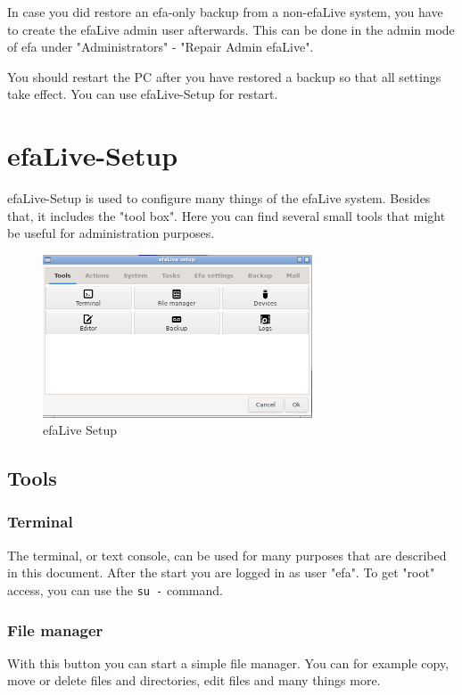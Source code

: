 \documentclass[a4paper,12pt,twoside]{article}
\begin{document}
In case you did restore an efa-only backup from a non-efaLive system, you have
to create the efaLive admin user afterwards. This can be done in the admin mode
of efa under "Administrators" - "Repair Admin efaLive".

You should restart the PC after you have restored a backup so that all
settings take effect. You can use efaLive-Setup for restart.


\section{efaLive-Setup}
\label{sct:efalivesetup}
efaLive-Setup is used to configure
many things of the efaLive system. Besides that, it includes the
"tool box". Here you can find several small
tools that might be useful for administration purposes.

\begin{figure}
    \centering
    \includegraphics[width=8cm]{screenshots/efalive_setup.png}
    \caption{efaLive Setup}
    \label{fig:efalivesetup}
\end{figure}


\subsection{Tools}
\label{sct:efalivesetup_tools}


\subsubsection{Terminal}
\label{sct:terminal}
The terminal, or text console, can be used for many purposes that are
described in this document. After the start you are logged in as user
"efa". To get "root" access, you can use the \texttt{su -} command.


\subsubsection{File manager}
\label{sct:file_manager}
With this button you can start a simple file manager. You can for
example copy, move or delete files and directories, edit files and many
things more.
\end{document}
